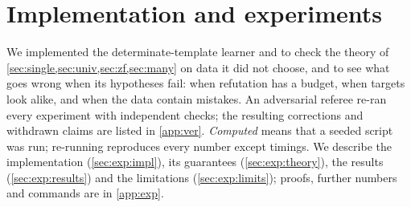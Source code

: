 \section{Implementation and experiments}\label{sec:exp}
\providecommand{\expReplE}{\mathrm{Repl}_{\mathrm{E}}}

We implemented the determinate-template learner and \DTRC{} to check the theory of \cref{sec:single,sec:univ,sec:zf,sec:many} on data it did not choose, and to see what goes wrong when its hypotheses fail: when refutation has a budget, when targets look alike, and when the data contain mistakes. An adversarial referee re-ran every experiment with independent checks; the resulting corrections and withdrawn claims are listed in \cref{app:ver}. \emph{Computed} means that a seeded script was run; re-running reproduces every number except timings. We describe the implementation (\cref{sec:exp:impl}), its guarantees (\cref{sec:exp:theory}), the results (\cref{sec:exp:results}) and the limitations (\cref{sec:exp:limits}); proofs, further numbers and commands are in \cref{app:exp}.

